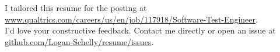 \documentclass{article}
\begin{document}
\vspace*{\fill}
\begin{center}
I tailored this resume for the posting at \href{https://www.qualtrics.com/careers/us/en/job/117918/Software-Test-Engineer}{www.qualtrics.com/careers/us/en/job/117918/Software-Test-Engineer}.\\
  I'd love your constructive feedback.  Contact me directly or open an issue at \href{https://github.com/Logan-Schelly/resume/issues}{github.com/Logan-Schelly/resume/issues}.
\end{center}
\end{document}
